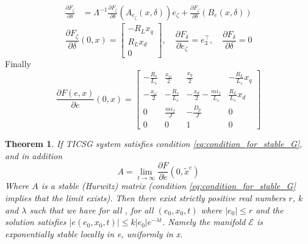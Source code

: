\documentclass[letterpaper, 10 pt, conference]{ieeeconf}
\newtheorem{theorem}{Theorem}[section]
\begin{document}
$$
\begin{aligned}
 \frac{\partial F_\zeta}{\partial \delta} & =  \varLambda^{-1} \frac{\partial F_\zeta}{\partial \delta}\left( A_{e_\zeta}(x,\delta) \right)e_\zeta+ \frac{\partial F_\zeta}{\partial \delta}\left(B_e(x,\delta)\right)
 \end{aligned}
$$
$$
 \frac{\partial F_\zeta}{\partial \delta}(0,x)  =  \left[\begin{array}{ccc}
 -R_L x_q\\
R_Lx_d\\
0
\end{array}\right],\quad \frac{\partial F_\delta}{\partial e_\zeta}=e_3^\top,\quad \frac{\partial F_\delta}{\partial \delta}
=0$$
Finally
\begin{equation}
\frac{\partial F(e,x)}{\partial e}(0,x)=\left[\begin{array}{cccc}
-\frac{R_{s}}{L_{s}} & \frac{x_{\omega}}{2} & \frac{x_{q}}{2} & -\frac{R_{L}}{L_{s}}x_{q}\\
-\frac{x_{\omega}}{2} & -\frac{R_{s}}{L_{s}} & -\frac{x_{d}}{2}-\frac{mi_f}{L_{s}} & \frac{R_{L}}{L_{s}}x_{d}\\
0 & \frac{mi_{f}}{J} & -\frac{D_{p}}{J} & 0\\
0 & 0 & 1 & 0
\end{array}\right]
\label{eq:AOft}
\end{equation}

\begin{theorem}\label{theorem:TICSGSync}
If TICSG system satisfies  condition \eqref{eq:condition_for_stable_G}, and in addition 
\begin{equation}
A=\lim_{t \to \infty}\frac{\partial F}{\partial e}(0,\tilde{x}^e)
\label{eq:eLinearizationLimit}
\end{equation}
Where $A$ is a stable (Hurwitz) matrix (condition \eqref{eq:condition_for_stable_G} implies that the limit exists). Then there exist strictly positive real numbers $r$, $k$ and $\lambda$ such that we have for all , for all $\left(e_0, x_0, t\right)$  where $\left| e_0\right| \le r$ and the solution satisfies $\left|e\left(e_0, x_0, t\right)\right| \le k\left|e_0\right| e^{-\lambda t}$. Namely the manifold $\mathscr{E}$ is exponentially stable locally in e, uniformly in x.
\end{theorem}
 
\end{document}
